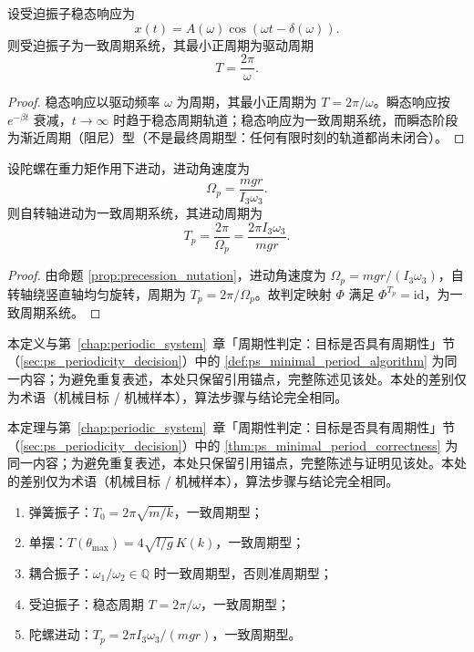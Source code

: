 \begin{lemma}[受迫振子的周期判定]\label{lem:forced_periodic}
设受迫振子稳态响应为
\[
x(t)=A(\omega)\cos(\omega t-\delta(\omega)).
\]
则受迫振子为一致周期系统，其最小正周期为驱动周期
\[
T=\frac{2\pi}{\omega}.
\]
\end{lemma}

\begin{proof}
稳态响应以驱动频率 $\omega$ 为周期，其最小正周期为 $T=2\pi/\omega$。瞬态响应按 $e^{-\beta t}$ 衰减，$t\to\infty$ 时趋于稳态周期轨道；稳态响应为一致周期系统，而瞬态阶段为渐近周期（阻尼）型（不是最终周期型：任何有限时刻的轨道都尚未闭合）。
\end{proof}

\begin{lemma}[陀螺进动的周期判定]\label{lem:gyroscope_periodic}
设陀螺在重力矩作用下进动，进动角速度为
\[
\Omega_p=\frac{mgr}{I_3\omega_3}.
\]
则自转轴进动为一致周期系统，其进动周期为
\[
T_p=\frac{2\pi}{\Omega_p}=\frac{2\pi I_3\omega_3}{mgr}.
\]
\end{lemma}

\begin{proof}
由命题 \ref{prop:precession_nutation}，进动角速度为 $\Omega_p=mgr/(I_3\omega_3)$，自转轴绕竖直轴均匀旋转，周期为 $T_p=2\pi/\Omega_p$。故判定映射 $\Phi$ 满足 $\Phi^{T_p}=\mathrm{id}$，为一致周期系统。
\end{proof}

\begin{definition}[机械最小正周期算法]\label{def:mech_minimal_period_algorithm}
本定义与第~\ref{chap:periodic_system}~章「周期性判定：目标是否具有周期性」节（\cref{sec:ps_periodicity_decision}）中的 \cref{def:ps_minimal_period_algorithm} 为同一内容；为避免重复表述，本处只保留引用锚点，完整陈述见该处。本处的差别仅为术语（机械目标 / 机械样本），算法步骤与结论完全相同。
\end{definition}

\begin{theorem}[机械最小正周期算法的正确性]\label{thm:mech_minimal_period_correctness}
本定理与第~\ref{chap:periodic_system}~章「周期性判定：目标是否具有周期性」节（\cref{sec:ps_periodicity_decision}）中的 \cref{thm:ps_minimal_period_correctness} 为同一内容；为避免重复表述，本处只保留引用锚点，完整陈述与证明见该处。本处的差别仅为术语（机械目标 / 机械样本），算法步骤与结论完全相同。
\end{theorem}

\begin{example}[机械周期判定实例]\label{ex:mech_periodic_examples}
\begin{enumerate}[label=(\roman*)]
    \item 弹簧振子：$T_0=2\pi\sqrt{m/k}$，一致周期型；
    \item 单摆：$T(\theta_{\max})=4\sqrt{l/g}\,K(k)$，一致周期型；
    \item 耦合振子：$\omega_1/\omega_2\in\mathbb Q$ 时一致周期型，否则准周期型；
    \item 受迫振子：稳态周期 $T=2\pi/\omega$，一致周期型；
    \item 陀螺进动：$T_p=2\pi I_3\omega_3/(mgr)$，一致周期型。
\end{enumerate}
\end{example}

